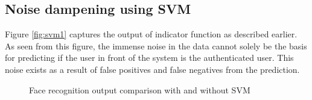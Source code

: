 \documentclass[%
        final,
        notitlepage,
        narroweqnarray,
        inline,
        ]{ieee}
\begin{document}
\subsection{Noise dampening using SVM} \label{sec:results-svm}
Figure \ref{fig:svm1} captures the output of indicator function as described earlier.
As seen from this figure, the immense noise in the data cannot solely be the basis for predicting if the user in front of the system is the authenticated user.
This noise exists as a result of false positives and false negatives from the prediction. 

\begin{figure}
	\centering
	\quad
	\caption{Face recognition output comparison with and without SVM}
\end{figure}
\end{document}

